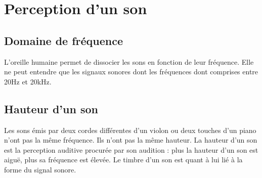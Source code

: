 \documentclass[a4paper,12pt,fleqn]{scrartcl}%
\begin{document}
\section{Perception d'un son}
	\subsection{Domaine de fréquence}
	L’oreille humaine permet de dissocier les sons en fonction de leur fréquence. Elle ne peut entendre que les signaux sonores dont les fréquences dont comprises entre 20Hz et 20kHz.
	\begin{figure}[h!]
		\centering
	\end{figure}
	\subsection{Hauteur d'un son}
	Les sons émis par deux cordes différentes d’un violon ou deux touches d’un piano n’ont pas la même fréquence. Ils n’ont pas la même hauteur.
La hauteur d’un son est la perception auditive procurée par son audition : plus la hauteur d’un son est aiguë, plus sa fréquence est élevée.
Le timbre d’un son est quant à lui lié à la forme du signal sonore.
	
\end{document}
